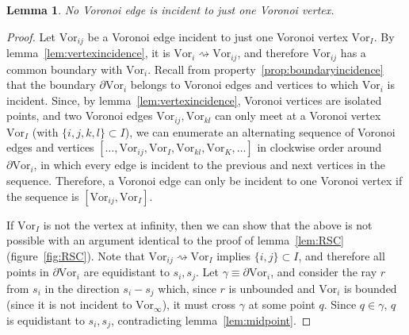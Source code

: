 \documentclass[11pt]{article}
\newtheorem{lemma}{Lemma}
\newcommand{\Vor}{\text{Vor}}
\begin{document}
\begin{lemma}\label{lem:val_ge2}
No Voronoi edge is incident to just one Voronoi vertex.
\end{lemma}
\begin{proof}
Let $\Vor_{ij}$ be a Voronoi edge incident to just one Voronoi vertex $\Vor_I$. 
By lemma~\ref{lem:vertexincidence}, it is $\Vor_i\rightsquigarrow\Vor_{ij}$, 
	and therefore $\Vor_{ij}$ has a common boundary with $\Vor_i$. 
Recall from property~\ref{prop:boundaryincidence} that the boundary $\partial\Vor_i$ belongs 
	to Voronoi edges and vertices to which $\Vor_i$ is incident. 
Since, by lemma~\ref{lem:vertexincidence}, Voronoi vertices are isolated points, 
	and two Voronoi edges $\Vor_{ij},\Vor_{kl}$ can only meet at a Voronoi vertex $\Vor_I$ (with $\{i,j,k,l\}\subset I$), 
	we can enumerate an alternating sequence of Voronoi edges and vertices 
	$\left[\dots,\Vor_{ij},\Vor_I,\Vor_{kl},\Vor_K,\dots\right]$ in clockwise order around $\partial\Vor_i$, 
	in which every edge is incident to the previous and next vertices in the sequence. 
Therefore, a Voronoi edge can only be incident to one Voronoi vertex if the sequence is $\left[\Vor_{ij},\Vor_I\right]$. 

If $\Vor_I$ is not the vertex at infinity, then we can show that the above is not possible 
	with an argument identical to the proof of lemma~\ref{lem:RSC} (figure~\ref{fig:RSC}). 
Note that $\Vor_{ij}\rightsquigarrow\Vor_I$ implies $\{i,j\}\subset I$, 
	and therefore all points in $\partial\Vor_i$ are equidistant to $s_i,s_j$. 
Let $\gamma\equiv\partial\Vor_i$, and consider the ray $r$ from $s_i$ in the direction $s_i-s_j$ 
	which, since $r$ is unbounded and $\Vor_i$ is bounded (since it is not incident to $\Vor_\infty$), 
	it must cross $\gamma$ at some point $q$. 
Since $q\in\gamma$, $q$ is equidistant to $s_i,s_j$, contradicting lemma~\ref{lem:midpoint}. 


\end{proof}
\end{document}
